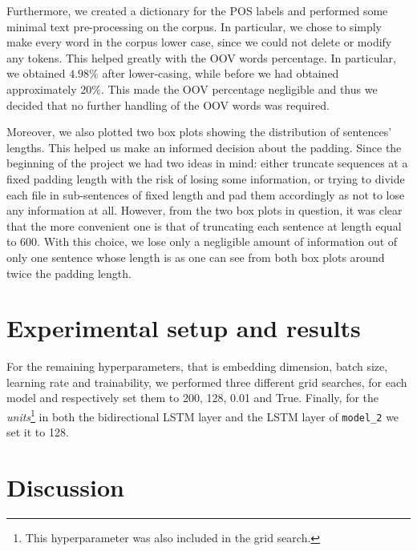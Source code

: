 \documentclass[11pt]{article}
\begin{document}
Furthermore, we created a dictionary for the POS labels and performed some minimal text pre-processing on the corpus. In particular, we chose to simply make every word in the corpus lower case, since we could not delete or modify any tokens. This helped greatly with the OOV words percentage. In particular, we obtained $4.98\%$ after lower-casing, while before we had obtained approximately $20\%$. This made the OOV percentage negligible and thus we decided that no further handling of the OOV words was required.

Moreover, we also plotted two box plots showing the distribution of sentences' lengths. This helped us make an informed decision about the padding. Since the beginning of the project we had two ideas in mind: either truncate sequences at a fixed padding length with the risk of losing some information, or trying to divide each file in sub-sentences of fixed length and pad them accordingly as not to lose any information at all. However, from the two box plots in question, it was clear that the more convenient one is that of truncating each sentence at length equal to 600. With this choice, we lose only a negligible amount of information out of only one sentence whose length is as one can see from both box plots around twice the padding length.

\section{Experimental setup and results}
\label{sec:results}
For the remaining hyperparameters, that is embedding dimension, batch size, learning rate and trainability, we performed three different grid searches, for each model and respectively set them to 200, 128, 0.01 and True. Finally, for the \emph{units}\footnote{This hyperparameter was also included in the grid search.} in both the bidirectional LSTM layer and the LSTM layer of \texttt{model\_2} we set it to 128.



\section{Discussion}
\label{sec:discussion}


\end{document}
